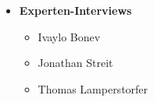 \nocite{*} 
\printbibliography

\begin{itemize}
	\item 
    	\textbf{Experten-Interviews}\\
		\begin{itemize}
        	\item Ivaylo Bonev
			\item Jonathan Streit
            \item Thomas Lamperstorfer
		\end{itemize}
\end{itemize}
